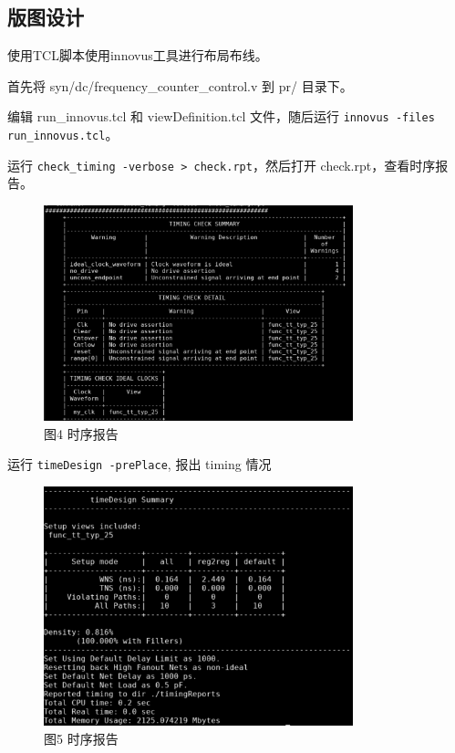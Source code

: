 \subsection{版图设计}

使用TCL脚本使用innovus工具进行布局布线。

首先将 syn/dc/frequency\_counter\_control.v 到 pr/ 目录下。

编辑 run\_innovus.tcl 和 viewDefinition.tcl 文件，随后运行 \texttt{innovus -files run\_innovus.tcl}。

运行 \texttt{check\_timing -verbose > check.rpt}，然后打开 check.rpt，查看时序报告。

\begin{figure}[H]
    \centering
    \includegraphics[width=0.8\textwidth]{images/final-task03-03.png}
    \caption{图4 时序报告}
\end{figure}

运行 \texttt{timeDesign -prePlace},  报出 timing 情况

\begin{figure}[H]
    \centering
    \includegraphics[width=0.8\textwidth]{images/final-task03-04.png}
    \caption{图5 时序报告}
\end{figure}

